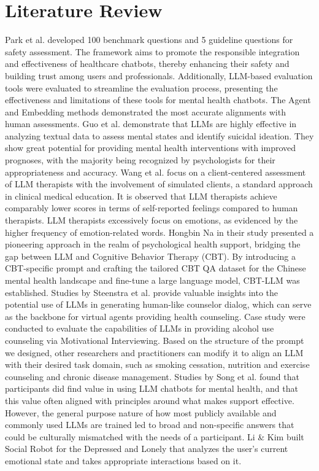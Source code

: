\section{Literature Review}
Park et al. \cite{park2024building} developed 100 benchmark questions and 5 guideline questions for safety assessment. The framework aims to promote the responsible integration and effectiveness of healthcare chatbots, thereby enhancing their safety and building trust among users and professionals. Additionally, LLM-based evaluation tools were evaluated to streamline the evaluation process, presenting the effectiveness and limitations of these tools for mental health chatbots. The Agent and Embedding methods demonstrated the most accurate alignments with human assessments. Guo et al. \cite{guo2024large} demonstrate that LLMs are highly effective in analyzing textual data to assess mental states and identify suicidal ideation. They show great potential for providing mental health interventions with improved prognoses, with the majority being recognized by psychologists for their appropriateness and accuracy. Wang et al. \cite{wang2024towards} focus on a client-centered assessment of LLM therapists with the involvement of simulated clients, a standard approach in clinical medical education. It is observed that LLM therapists achieve comparably lower scores in terms of self-reported feelings compared to human therapists. LLM therapists excessively focus on emotions, as evidenced by the higher frequency of emotion-related words. Hongbin Na \cite{na2024cbt} in their study presented a pioneering approach in the realm of psychological health support, bridging the gap between LLM and Cognitive Behavior Therapy (CBT). By introducing a CBT-specific prompt and crafting the tailored CBT QA dataset for the Chinese mental health landscape and fine-tune a large language model, CBT-LLM was established. Studies by Steenstra et al. \cite{steenstra2024virtual}  provide valuable insights into the potential use of LLMs in generating human-like counselor dialog, which can serve as the backbone for virtual agents providing health counseling. Case study were conducted to evaluate the capabilities of LLMs in providing alcohol use counseling via Motivational Interviewing. Based on the structure of the prompt we designed, other researchers and practitioners can modify it to align an LLM with their desired task domain, such as smoking cessation, nutrition and exercise counseling and chronic disease management. Studies by Song et al. \cite{song2024typing} found that participants did find value in using LLM chatbots for mental health, and that this value often aligned with principles around what makes support effective. However, the general purpose nature of how most publicly available and commonly used LLMs are trained led to broad and non-specific answers that could be culturally mismatched with the needs of a participant. Li \& Kim \cite{lisocial} built Social Robot for the Depressed and Lonely that analyzes the user's current emotional state and takes appropriate interactions based on it.